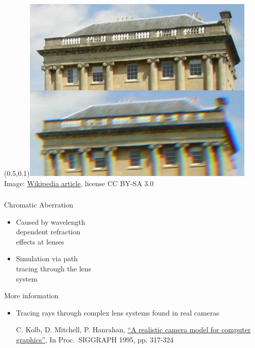 \documentclass[utf8,stillsansserifmath,fleqn,t]{beamer}
\newcommand{\literature}[1]{{\tiny #1 \par}}
\begin{document}
\begin{frame}
\begin{textblock}{0.5}(0.5,0.1)\includegraphics[width=\textwidth]{./fig/chromatic-aberration.jpg}\\
{\tiny Image: \href{https://en.wikipedia.org/wiki/Chromatic_aberration}{Wikipedia article}, license CC BY-SA 3.0}
\end{textblock}
\frametitle{\insertsection}
Chromatic Aberration
\begin{itemize}
\item Caused by wavelength\\ dependent refraction\\ effects at lenses
\item Simulation via path\\ tracing through the lens\\ system
\end{itemize}
\vspace*{7em}
More information
\begin{itemize}
\item Tracing rays through complex lens systems found in real cameras\\
\literature{C. Kolb, D. Mitchell, P. Hanrahan, \href{https://graphics.stanford.edu/papers/camera/}{``A realistic camera
model for computer graphics''}, In Proc.~SIGGRAPH 1995, pp. 317-324}
\end{itemize}
\end{frame}
\end{document}
